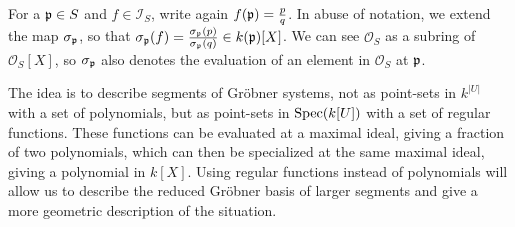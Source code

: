 For a $\mathfrak p \in S$ and $f \in \mathcal I_{S}$, write again $f(\mathfrak p) = \frac{p}{q}$. In abuse of notation, we extend the map $\sigma_{\mathfrak p}$, so that $\sigma_{\mathfrak p}(f) = \frac{\sigma_{\mathfrak p}(p)}{\sigma_{\mathfrak p}(q)} \in k(\mathfrak p)[X]$. We can see $\mathcal O_{S}$ as a subring of $\mathcal O_{S}[X]$, so $\sigma_{\mathfrak p}$ also denotes the evaluation of an element in $\mathcal O_{S}$ at $\mathfrak p$.

The idea is to describe segments of Gröbner systems, not as point-sets in $k^{|U|}$ with a set of polynomials, but as point-sets in $\operatorname{Spec}(k[U])$ with a set of regular functions. These functions can be evaluated at a maximal ideal, giving a fraction of two polynomials, which can then be specialized at the same maximal ideal, giving a polynomial in $k[X]$. Using regular functions instead of polynomials will allow us to describe the reduced Gröbner basis of larger segments and give a more geometric description of the situation.

